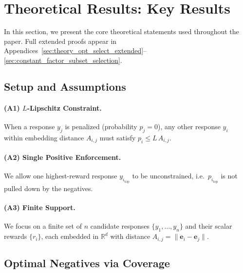 \vspace{-0.1in}
\section{Theoretical Results: Key Results}
\label{sec:theory_main}

\vspace{-0.05in}
In this section, we present the core theoretical statements used throughout the paper. Full extended proofs appear in Appendices~\ref{sec:theory_opt_select_extended}--\ref{sec:constant_factor_subset_selection}. 

\vspace{-0.15in}
\subsection{Setup and Assumptions}

\vspace{-0.05in}
\paragraph{(A1) $L$-Lipschitz Constraint.}
When a response $y_j$ is penalized (probability $p_j = 0$), any other response $y_i$ within embedding distance $A_{i,j}$ must satisfy $p_i \le L \, A_{i,j}$. 

\vspace{-0.1in}
\paragraph{(A2) Single Positive Enforcement.}
We allow one highest-reward response $y_{i_{\mathrm{top}}}$ to be unconstrained, i.e.\ $p_{i_{\mathrm{top}}}$ is not pulled down by the negatives. 

\vspace{-0.1in}
\paragraph{(A3) Finite Support.}
We focus on a finite set of $n$ candidate responses $\{y_1,\dots,y_n\}$ and their scalar rewards $\{r_i\}$, each embedded in $\mathbb{R}^d$ with distance $A_{i,j} = \|\mathbf{e}_i-\mathbf{e}_j\|$. 

\vspace{-0.1in}
\subsection{Optimal Negatives via Coverage}

